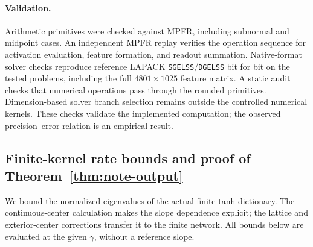 \paragraph{Validation.}
Arithmetic primitives were checked against MPFR, including subnormal
and midpoint cases. An independent MPFR replay verifies the operation
sequence for activation evaluation, feature formation, and readout
summation. Native-format solver checks reproduce reference LAPACK
\texttt{SGELSS}/\texttt{DGELSS} bit for bit on the tested problems,
including the full $4801\times1025$ feature matrix.
A static audit checks that numerical operations pass through the
rounded primitives. Dimension-based solver branch selection remains
outside the controlled numerical kernels.
These checks validate the implemented computation; the observed
precision--error relation is an empirical result.

\subsection{Finite-kernel rate bounds and proof of Theorem~\ref{thm:note-output}}
\label{app:note-spectrum}

We bound the normalized eigenvalues of the actual finite tanh dictionary.
The continuous-center calculation makes the slope dependence explicit;
the lattice and exterior-center corrections transfer it to the finite network.
All bounds below are evaluated at the given $\gamma$, without a reference slope.

